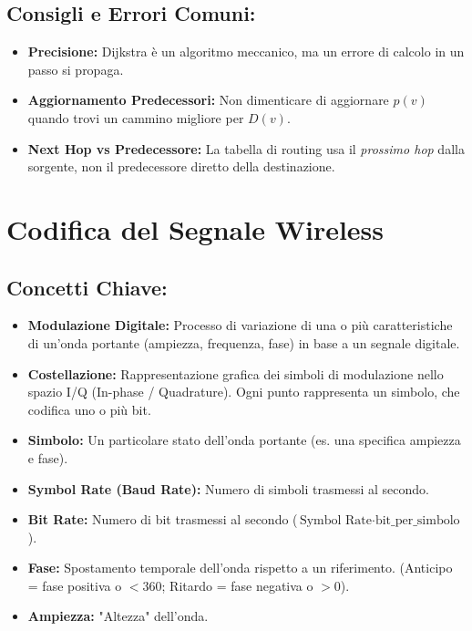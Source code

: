 \subsection{Consigli e Errori Comuni:}
\begin{itemize}
    \item \textbf{Precisione:} Dijkstra è un algoritmo meccanico, ma un errore di calcolo in un passo si propaga.
    \item \textbf{Aggiornamento Predecessori:} Non dimenticare di aggiornare $p(v)$ quando trovi un cammino migliore per $D(v)$.
    \item \textbf{Next Hop vs Predecessore:} La tabella di routing usa il \textit{prossimo hop} dalla sorgente, non il predecessore diretto della destinazione.
\end{itemize}

\section{Codifica del Segnale Wireless}

\subsection{Concetti Chiave:}
\begin{itemize}
    \item \textbf{Modulazione Digitale:} Processo di variazione di una o più caratteristiche di un'onda portante (ampiezza, frequenza, fase) in base a un segnale digitale.
    \item \textbf{Costellazione:} Rappresentazione grafica dei simboli di modulazione nello spazio I/Q (In-phase / Quadrature). Ogni punto rappresenta un simbolo, che codifica uno o più bit.
    \item \textbf{Simbolo:} Un particolare stato dell'onda portante (es. una specifica ampiezza e fase).
    \item \textbf{Symbol Rate (Baud Rate):} Numero di simboli trasmessi al secondo.
    \item \textbf{Bit Rate:} Numero di bit trasmessi al secondo ($\text{Symbol Rate} \cdot \text{bit\_per\_simbolo}$).
    \item \textbf{Fase:} Spostamento temporale dell'onda rispetto a un riferimento. (Anticipo = fase positiva o $<$360\textdegree; Ritardo = fase negativa o $>$0\textdegree).
    \item \textbf{Ampiezza:} "Altezza" dell'onda.
\end{itemize}

